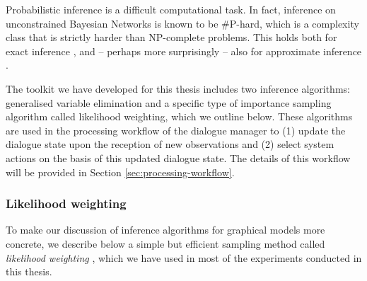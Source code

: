 Probabilistic inference is a difficult computational task.  In fact, inference on unconstrained Bayesian Networks is known to be {\#}P-hard, which is a complexity class that is strictly harder than NP-complete problems.  This holds both for exact inference \citep{Cooper90}, and -- perhaps more surprisingly -- also for approximate inference \citep{Dagum1993}.  


The \opendial toolkit we have developed for this thesis includes two inference algorithms: generalised variable elimination \citep[][p. 1103]{Koller+Friedman:09} and a specific type of importance sampling algorithm called likelihood weighting, which we outline below. These algorithms are used in the processing workflow of the dialogue manager to (1) update the dialogue state upon the reception of new observations and (2) select system actions on the basis of this updated dialogue state. The details of this workflow will be provided in Section \ref{sec:processing-workflow}.  

\subsubsection*{Likelihood weighting} 

To make our discussion of inference algorithms for graphical models more concrete, we describe below a simple but efficient sampling method called \textit{likelihood weighting} \citep{FungC89}, which we have used in most of the experiments conducted in this thesis.  


